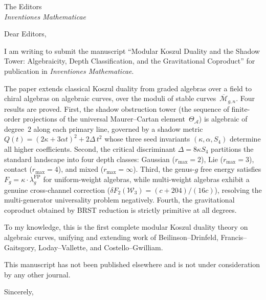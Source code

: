 \documentclass[11pt]{letter}
\date{\today}
\begin{document}
\begin{letter}{The Editors\\
\emph{Inventiones Mathematicae}}

\opening{Dear Editors,}

I am writing to submit the manuscript ``Modular Koszul Duality and
the Shadow Tower: Algebraicity, Depth Classification, and the
Gravitational Coproduct'' for publication in \emph{Inventiones
Mathematicae}.

The paper extends classical Koszul duality from graded algebras
over a field to chiral algebras on algebraic curves, over the moduli
of stable curves~$\overline{\mathcal{M}}_{g,n}$. Four results
are proved. First, the shadow obstruction tower (the sequence of
finite-order projections of the universal Maurer--Cartan
element~$\Theta_{\mathcal{A}}$) is algebraic of degree~$2$ along
each primary line, governed by a shadow metric
$Q(t) = (2\kappa + 3\alpha t)^2 + 2\Delta\, t^2$ whose three seed
invariants $(\kappa, \alpha, S_4)$ determine all higher
coefficients. Second, the critical discriminant
$\Delta = 8\kappa S_4$ partitions the standard landscape into four
depth classes: Gaussian ($r_{\max} = 2$), Lie ($r_{\max} = 3$),
contact ($r_{\max} = 4$), and mixed ($r_{\max} = \infty$). Third,
the genus-$g$ free energy satisfies
$F_g = \kappa \cdot \lambda_g^{\mathrm{FP}}$ for uniform-weight
algebras, while multi-weight algebras exhibit a genuine cross-channel
correction ($\delta F_2(\mathcal{W}_3) = (c{+}204)/(16c)$),
resolving the multi-generator universality problem negatively.
Fourth, the gravitational coproduct obtained by BRST reduction is
strictly primitive at all degrees.

To my knowledge, this is the first complete modular Koszul duality
theory on algebraic curves, unifying and extending work of
Beilinson--Drinfeld, Francis--Gaitsgory, Loday--Vallette, and
Costello--Gwilliam.

This manuscript has not been published elsewhere and is not under
consideration by any other journal.

\closing{Sincerely,}

\end{letter}
\end{document}
